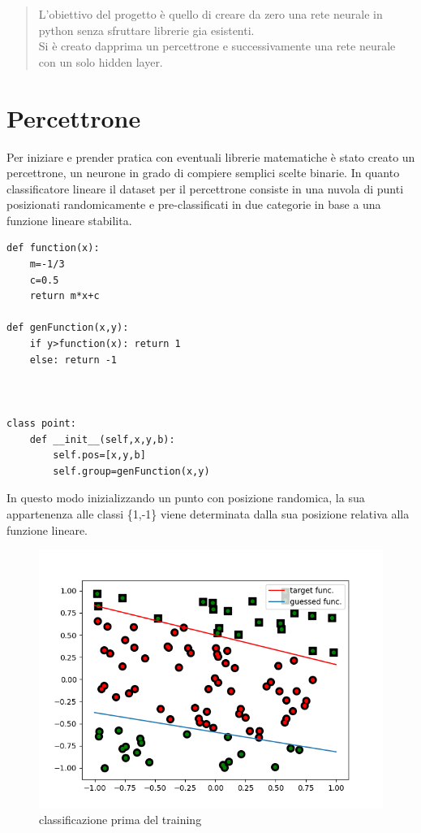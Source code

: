 \documentclass[12pt]{article}
\begin{document}
\begin{titlepage}
\end{titlepage}
\begin{abstract}
L'obiettivo del progetto è quello di creare da zero una rete neurale in python senza sfruttare librerie gia esistenti.
\\Si è creato dapprima un percettrone e successivamente una rete neurale con un solo hidden layer.
\end{abstract}
\section{Percettrone}
Per iniziare e prender pratica con eventuali librerie matematiche è stato creato un percettrone, un neurone in grado di compiere semplici scelte binarie.
In quanto classificatore lineare il dataset per il percettrone consiste in una nuvola di punti posizionati randomicamente e pre-classificati in due categorie in base a una funzione lineare stabilita.
\begin{lstlisting}[language=myPython]
def function(x):
	m=-1/3
	c=0.5
	return m*x+c

def genFunction(x,y):
	if y>function(x): return 1
	else: return -1



class point:
    def __init__(self,x,y,b):
		self.pos=[x,y,b]
		self.group=genFunction(x,y)

\end{lstlisting}
In questo modo inizializzando un punto con posizione randomica, la sua appartenenza alle classi \{1,-1\} viene determinata dalla sua posizione relativa alla funzione lineare.
\newpage
\begin{figure}[h!]
	\centering
	\includegraphics[width=10 cm]{Perc_before.png}
	\caption{classificazione prima del training}
	\label{fig:percBefore}
\end{figure}
\end{document}
